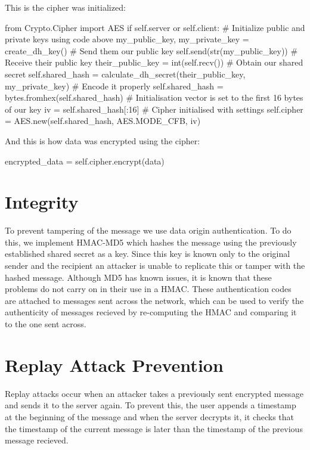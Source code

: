 \documentclass[12pt,a4paper]{article}
\begin{document}
This is the cipher was initialized:
\begin{center}
\begin{python}
from Crypto.Cipher import AES
if self.server or self.client:
    # Initialize public and private keys using code above
    my_public_key, my_private_key = create_dh_key()
    # Send them our public key
    self.send(str(my_public_key))
    # Receive their public key
    their_public_key = int(self.recv())
    # Obtain our shared secret
    self.shared_hash = calculate_dh_secret(their_public_key, my_private_key)
    # Encode it properly
    self.shared_hash = bytes.fromhex(self.shared_hash)
# Initialisation vector is set to the first 16 bytes of our key
iv = self.shared_hash[:16]
# Cipher initialised with settings
self.cipher = AES.new(self.shared_hash, AES.MODE_CFB, iv)
\end{python}
\end{center}
And this is how data was encrypted using the cipher:
\begin{center}\begin{python}
encrypted_data = self.cipher.encrypt(data)
\end{python}\end{center}

\section{Integrity}
To prevent tampering of the message we use data origin authentication. To do this, we implement HMAC-MD5 which hashes the message using the previously established shared secret as a key. Since this key is known only to the original sender and the recipient an attacker is unable to replicate this or tamper with the hashed message. Although MD5 has known issues, it is known that these problems do not carry on in their use in a HMAC. These authentication codes are attached to messages sent across the network, which can be used to verify the authenticity of messages recieved by re-computing the HMAC and comparing it to the one sent across.

\section{Replay Attack Prevention}
Replay attacks occur when an attacker takes a previously sent encrypted message and sends it to the server again. To prevent this, the user appends a timestamp at the beginning of the message and when the server decrypts it, it checks that the timestamp of the current message is later than the timestamp of the previous message recieved.
\end{document}
